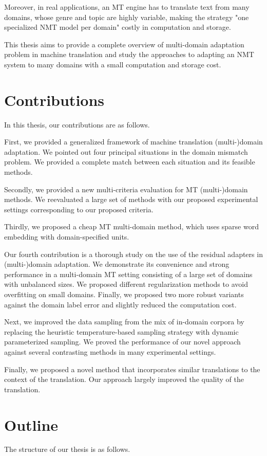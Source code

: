 Moreover, in real applications, an MT engine has to translate text from many domains, whose genre and topic are highly variable, making the strategy "one specialized NMT model per domain" costly in computation and storage.  

This thesis aims to provide a complete overview of multi-domain adaptation problem in machine translation and study the approaches to adapting an NMT system to many domains with a small computation and storage cost.

\section{Contributions}
In this thesis, our contributions are as follows.

First, we provided a generalized framework of machine translation (multi-)domain adaptation. We pointed out four principal situations in the domain mismatch problem. We provided a complete match between each situation and its feasible methods.

Secondly, we provided a new multi-criteria evaluation for MT (multi-)domain methods. We reevaluated a large set of methods with our proposed experimental settings corresponding to our proposed criteria.

Thirdly, we proposed a cheap MT multi-domain method, which uses sparse word embedding with domain-specified units.

Our fourth contribution is a thorough study on the use of the residual adapters in (multi-)domain adaptation. We demonstrate its convenience and strong performance in a multi-domain MT setting consisting of a large set of domains with unbalanced sizes. We proposed different regularization methods to avoid overfitting on small domains. Finally, we proposed two more robust variants against the domain label error and slightly reduced the computation cost.

Next, we improved the data sampling from the mix of in-domain corpora by replacing the heuristic temperature-based sampling strategy with dynamic parameterized sampling. We proved the performance of our novel approach against several contrasting methods in many experimental settings.

Finally, we proposed a novel method that incorporates similar translations to the context of the translation. Our approach largely improved the quality of the translation.

\section{Outline}
The structure of our thesis is as follows.


